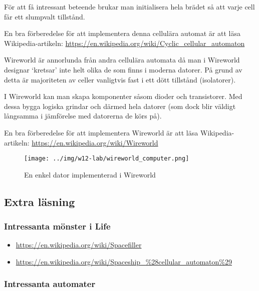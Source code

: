         För att få intressant beteende brukar man initialisera hela brädet så att varje cell får ett slumpvalt tillstånd.

        En bra förberedelse för att implementera denna cellulära automat är att läsa Wikipedia-artikeln: \url{https://en.wikipedia.org/wiki/Cyclic_cellular_automaton}


        Wireworld är annorlunda från andra cellulära automata då man i Wireworld designar `kretsar' inte helt olika de som finns i moderna datorer.
        På grund av detta är majoriteten av celler vanligtvis fast i ett dött tillstånd (isolatorer).

        I Wireworld kan man skapa komponenter såsom dioder och transistorer. Med dessa bygga logiska grindar och därmed hela datorer (som dock blir väldigt långsamma i jämförelse med datorerna de körs på).

        En bra förberedelse för att implementera Wireworld är att läsa Wikipedia-artikeln: \url{https://en.wikipedia.org/wiki/Wireworld}

        \begin{figure}[h]
            \begin{center}
                \texttt{[image: ../img/w12-lab/wireworld\_computer.png]}
            \end{center}
            \caption{En enkel dator implementerad i Wireworld\protect\footnotemark}
        \end{figure}


\subsection{Extra läsning}

\subsubsection{Intressanta mönster i Life}

\begin{itemize}[noitemsep,topsep=0pt]
    \item \url{https://en.wikipedia.org/wiki/Spacefiller}
    \item \url{https://en.wikipedia.org/wiki/Spaceship_\%28cellular_automaton\%29}
\end{itemize}

\subsubsection{Intressanta automater}


